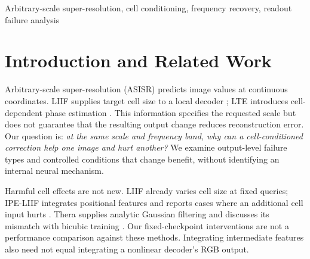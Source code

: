 \begin{abstract}
Target-cell conditioning in arbitrary-scale super-resolution can improve
average reconstruction while harming particular images or frequency bands.
We investigate this discrepancy using saved natural-image outputs and
controlled probes of frozen models. Low-resolution Nyquist normalisation
reduces cross-scale recovery variation in all 27 model--dataset--seed
groups, but pooled consistency hides image-wise differences. An exact
squared-error decomposition separates harmful corrections into overshoot
and wrong direction: their frequencies differ between LTE and SC-INR and
between band and full-RGB evaluation. Halving the correction rescues
11/13 and 6/27 harmful band outcomes, respectively, yet increases overall
RGB MSE by 2.41\% and 0.97\%. At fixed scale, controlled high-frequency
input paths can reverse correction alignment; changing target phase at
fixed power also reverses readout gain. These finite experiments show
why frequency ordering and global attenuation are insufficient descriptions
of readout benefit. They provide conditional failure diagnostics, rather
than a new decoder, a deployable selector or a universal causal mechanism.
\end{abstract}
\begin{keywords}
Arbitrary-scale super-resolution, cell conditioning, frequency recovery,
readout failure analysis
\end{keywords}

\section{Introduction and Related Work}
\label{sec:intro}
Arbitrary-scale super-resolution (ASISR) predicts image values at continuous
coordinates. LIIF supplies target cell size to a local decoder
\cite{chen2021liif}; LTE introduces cell-dependent phase estimation
\cite{lee2022lte}. This information specifies the requested scale but does
not guarantee that the resulting output change reduces reconstruction
error. Our question is: \emph{at the same scale and frequency band, why
can a cell-conditioned correction help one image and hurt another?}
We examine output-level failure types and controlled conditions that
change benefit, without identifying an internal neural mechanism.

Harmful cell effects are not new. LIIF already varies cell size at fixed
queries; IPE-LIIF integrates positional features and reports cases where
an additional cell input hurts \cite{liu2021ipe}. Thera supplies analytic
Gaussian filtering and discusses its mismatch with bicubic training
\cite{becker2025thera}. Our fixed-checkpoint interventions are not a
performance comparison against these methods. Integrating intermediate
features also need not equal integrating a nonlinear decoder's RGB output.

